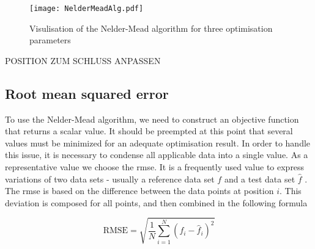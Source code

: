


 



\begin{figure}[H]
    \centering
    \texttt{[image: NelderMeadAlg.pdf]}
    \caption{Visulisation of the Nelder-Mead algorithm for three optimisation parameters }
    \label{fig:nelderMead}
\end{figure}

POSITION ZUM SCHLUSS ANPASSEN

\subsection{Root mean squared error} \label{subsec: RMSE}
To use the Nelder-Mead algorithm, we need to construct an objective function that returns a scalar value. It should be preempted at this point that several values must be minimized for an adequate optimisation result. In order to handle this issue, it is necessary to condense all applicable data into a single value. As a representative value we choose the \acrfull{rmse}. It is a frequently used value to express variations of two data sets - usually a reference data set $f$ and a test data set $\hat{f}$ \cite{morrow_method_2010}. The \acrshort{rmse} is based on the difference between the data points at position $i$. This deviation is composed for all points, and then combined in the following formula

\begin{equation} \label{eq: RMSE}
    \text{RMSE} = \sqrt{\frac{1}{N}\sum_{i=1}^{N} (f_i - \hat{f}_i)^2}
\end{equation}

